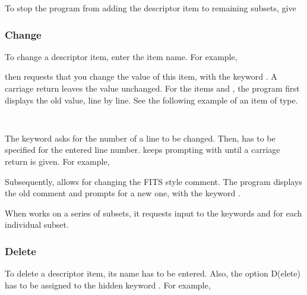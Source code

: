 To stop the program from adding the descriptor item to remaining
subsets, give


\subsubsection{Change}

To change a descriptor item, enter the item name.  For example,


 then requests that you change the value of this item, with
the keyword .  A carriage return leaves the value
unchanged.  
For the items  and ,
the program first displays the old value, line by line.  See the
following example of an item of  type. 

{\tt
{}
}


The keyword  asks for the number of a line to be changed. 
Then,  has to be specified for the entered line number. 
 keeps prompting with  until a carriage
return is given.  For example,






Subsequently,  allows for changing the FITS style
comment.  The program displays the old comment and prompts for a new
one, with the keyword . 

When  works on a series of subsets, it requests input to
the keywords  and  for each individual
subset. 

\subsubsection{Delete} 

To delete a descriptor item, its name has to be entered.  Also, the
option D(elete) has to be assigned to the hidden keyword
.  For example,

